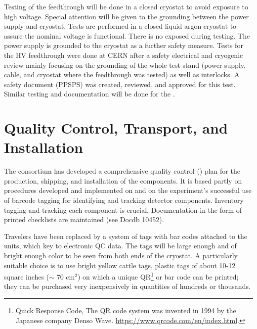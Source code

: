 Testing of the  feedthrough will be done in a closed cryostat to avoid exposure to high voltage.  Special attention will be given to the grounding between the power supply and cryostat. Tests are performed in a closed liquid argon cryostat to assure the nominal voltage is functional.  There is no exposed  during testing.  The power supply is grounded to the cryostat as a further safety measure. Tests for the  HV feedthrough were done at CERN after a safety electrical and cryogenic review mainly focusing on the grounding of the whole test stand (power supply, cable, and cryostat where the feedthrough was tested) as well as interlocks. A safety document (PPSPS) was created, reviewed, and approved for this test. Similar testing and documentation will be done for the .



\section{Quality Control, Transport, and Installation}
\label{sec:fdsp-hv-transport}
The  consortium has developed a comprehensive quality control ()
plan for the production, shipping, and installation of the   components. %
It is based partly on  procedures developed and implemented on  and on the \nova experiment's successful use of barcode tagging for identifying and tracking detector components.  Inventory tagging and tracking each component is crucial. Documentation in the form of printed checklists are maintained (see Docdb 10452). 

Travelers have been replaced by a system of tags with bar codes attached to the units, which key to electronic QC data. The tags will be large enough and of bright enough color to be seen from both ends of the cryostat.
A particularly suitable choice is to use 
bright yellow cattle tags, plastic tags of about 10-12 square inches ($\sim$ 70 cm$^{2}$) on which a unique QR\footnote{Quick Response Code, The QR\texttrademark{} code system was invented in 1994 by the Japanese company Denso Wave. \url{https://www.qrcode.com/en/index.html}.} or bar code can be printed; they can be purchased very inexpensively in quantities of hundreds or thousands.


